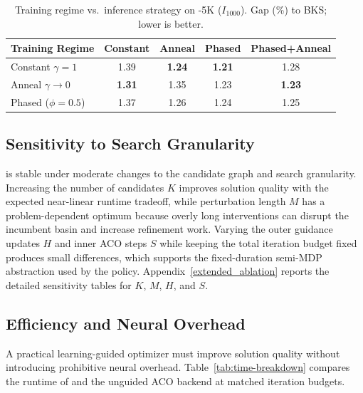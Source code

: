 \begin{table}[h]
\centering
\caption{Training regime vs.\ inference strategy on \TSP{}-5K ($I_{1000}$). Gap (\%) to BKS; lower is better.}
\label{tab:train-strategy}
\footnotesize
\setlength{\tabcolsep}{2pt}
\begin{tabular*}{\columnwidth}{@{\extracolsep{\fill}}lcccc@{}}
\toprule
Training Regime & Constant & Anneal & Phased & Phased+Anneal \\
\midrule
Constant $\gamma{=}1$ & 1.39 & \textbf{1.24} & \textbf{1.21} & 1.28 \\
Anneal $\gamma{\to}0$ & \textbf{1.31} & 1.35 & 1.23 & \textbf{1.23} \\
Phased ($\phi{=}0.5$) & 1.37 & 1.26 & 1.24 & 1.25 \\
\bottomrule
\end{tabular*}
\end{table}

\subsection{Sensitivity to Search Granularity}
\label{sec:sensitivity_summary}

\DyNACS{} is stable under moderate changes to the candidate graph and search granularity. Increasing the number of candidates $K$ improves solution quality with the expected near-linear runtime tradeoff, while perturbation length $M$ has a problem-dependent optimum because overly long interventions can disrupt the incumbent basin and increase refinement work. Varying the outer guidance updates $H$ and inner ACO steps $S$ while keeping the total iteration budget fixed produces small differences, which supports the fixed-duration semi-MDP abstraction used by the policy. Appendix~\ref{extended_ablation} reports the detailed sensitivity tables for $K$, $M$, $H$, and $S$.

\subsection{Efficiency and Neural Overhead}
\label{sec:runtime}

A practical learning-guided optimizer must improve solution quality without introducing prohibitive neural overhead. Table~\ref{tab:time-breakdown} compares the runtime of \DyNACS{} and the unguided ACO backend at matched iteration budgets.

